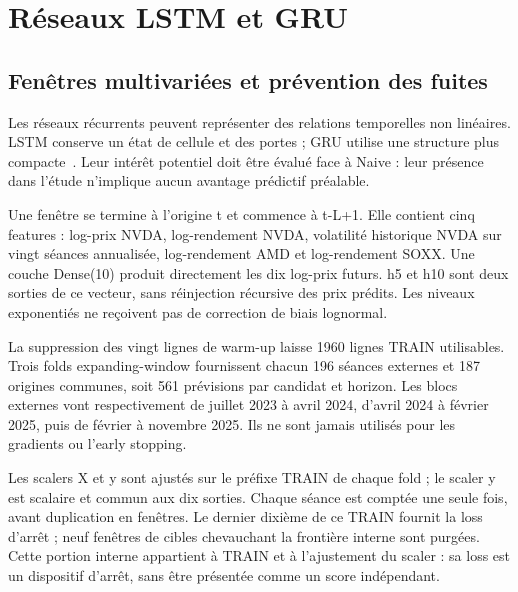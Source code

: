 \section{Réseaux LSTM et GRU}
\label{sec:neural}

\subsection{Fenêtres multivariées et prévention des fuites}



Les réseaux récurrents peuvent représenter des relations temporelles non linéaires. LSTM conserve un état de cellule et des portes ; GRU utilise une structure plus compacte~\cite{R11,R12}. Leur intérêt potentiel doit être évalué face à Naive : leur présence dans l’étude n’implique aucun avantage prédictif préalable.



Une fenêtre se termine à l’origine t et commence à t-L+1. Elle contient cinq features : log-prix NVDA, log-rendement NVDA, volatilité historique NVDA sur vingt séances annualisée, log-rendement AMD et log-rendement SOXX. Une couche Dense(10) produit directement les dix log-prix futurs. h5 et h10 sont deux sorties de ce vecteur, sans réinjection récursive des prix prédits. Les niveaux exponentiés ne reçoivent pas de correction de biais lognormal.



La suppression des vingt lignes de warm-up laisse 1960 lignes TRAIN utilisables. Trois folds expanding-window fournissent chacun 196 séances externes et 187 origines communes, soit 561 prévisions par candidat et horizon. Les blocs externes vont respectivement de juillet 2023 à avril 2024, d’avril 2024 à février 2025, puis de février à novembre 2025. Ils ne sont jamais utilisés pour les gradients ou l’early stopping.



Les scalers X et y sont ajustés sur le préfixe TRAIN de chaque fold ; le scaler y est scalaire et commun aux dix sorties. Chaque séance est comptée une seule fois, avant duplication en fenêtres. Le dernier dixième de ce TRAIN fournit la loss d’arrêt ; neuf fenêtres de cibles chevauchant la frontière interne sont purgées. Cette portion interne appartient à TRAIN et à l’ajustement du scaler : sa loss est un dispositif d’arrêt, sans être présentée comme un score indépendant.







